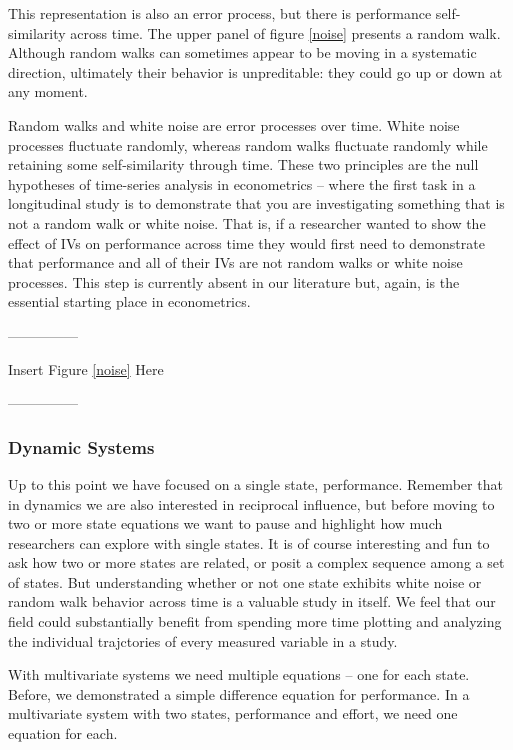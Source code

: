 \documentclass[english,,man]{apa6}
\theoremstyle{definition}
\theoremstyle{definition}
\theoremstyle{definition}
\theoremstyle{remark}
\begin{document}
\noindent This representation is also an error process, but there is
performance self-similarity across time. The upper panel of figure
\ref{noise} presents a random walk. Although random walks can sometimes
appear to be moving in a systematic direction, ultimately their behavior
is unpreditable: they could go up or down at any moment.

Random walks and white noise are error processes over time. White noise
processes fluctuate randomly, whereas random walks fluctuate randomly
while retaining some self-similarity through time. These two principles
are the null hypotheses of time-series analysis in econometrics -- where
the first task in a longitudinal study is to demonstrate that you are
investigating something that is not a random walk or white noise. That
is, if a researcher wanted to show the effect of IVs on performance
across time they would first need to demonstrate that performance and
all of their IVs are not random walks or white noise processes. This
step is currently absent in our literature but, again, is the essential
starting place in econometrics.

\begin{center}

---------------

Insert Figure \ref{noise} Here

---------------

\end{center}

\hypertarget{dynamic-systems}{%
\subsubsection{Dynamic Systems}\label{dynamic-systems}}

Up to this point we have focused on a single state, performance.
Remember that in dynamics we are also interested in reciprocal
influence, but before moving to two or more state equations we want to
pause and highlight how much researchers can explore with single states.
It is of course interesting and fun to ask how two or more states are
related, or posit a complex sequence among a set of states. But
understanding whether or not one state exhibits white noise or random
walk behavior across time is a valuable study in itself. We feel that
our field could substantially benefit from spending more time plotting
and analyzing the individual trajctories of every measured variable in a
study.

With multivariate systems we need multiple equations -- one for each
state. Before, we demonstrated a simple difference equation for
performance. In a multivariate system with two states, performance and
effort, we need one equation for each.
\end{document}
